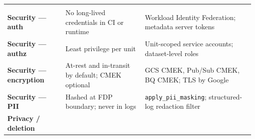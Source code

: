 \documentclass[
  11pt,
  british,
  oneside]{book}
\begin{document}
\begin{longtable}[]{@{}lll@{}}
\begin{minipage}[t]{0.30\columnwidth}
\end{minipage}\tabularnewline
\begin{minipage}[t]{0.30\columnwidth}\raggedright
\textbf{Security --- auth}\strut
\end{minipage} & \begin{minipage}[t]{0.30\columnwidth}\raggedright
No long-lived credentials in CI or runtime\strut
\end{minipage} & \begin{minipage}[t]{0.30\columnwidth}\raggedright
Workload Identity Federation; metadata server tokens\strut
\end{minipage}\tabularnewline
\begin{minipage}[t]{0.30\columnwidth}\raggedright
\textbf{Security --- authz}\strut
\end{minipage} & \begin{minipage}[t]{0.30\columnwidth}\raggedright
Least privilege per unit\strut
\end{minipage} & \begin{minipage}[t]{0.30\columnwidth}\raggedright
Unit-scoped service accounts; dataset-level roles\strut
\end{minipage}\tabularnewline
\begin{minipage}[t]{0.30\columnwidth}\raggedright
\textbf{Security --- encryption}\strut
\end{minipage} & \begin{minipage}[t]{0.30\columnwidth}\raggedright
At-rest and in-transit by default; CMEK optional\strut
\end{minipage} & \begin{minipage}[t]{0.30\columnwidth}\raggedright
GCS CMEK, Pub/Sub CMEK, BQ CMEK; TLS by Google\strut
\end{minipage}\tabularnewline
\begin{minipage}[t]{0.30\columnwidth}\raggedright
\textbf{Security --- PII}\strut
\end{minipage} & \begin{minipage}[t]{0.30\columnwidth}\raggedright
Hashed at FDP boundary; never in logs\strut
\end{minipage} & \begin{minipage}[t]{0.30\columnwidth}\raggedright
\texttt{apply\_pii\_masking}; structured-log redaction filter\strut
\end{minipage}\tabularnewline
\begin{minipage}[t]{0.30\columnwidth}\raggedright
\textbf{Privacy / deletion}\strut
\end{minipage} & \begin{minipage}[t]{0.30\columnwidth}\raggedright

\end{minipage}
\end{longtable}
\end{document}
